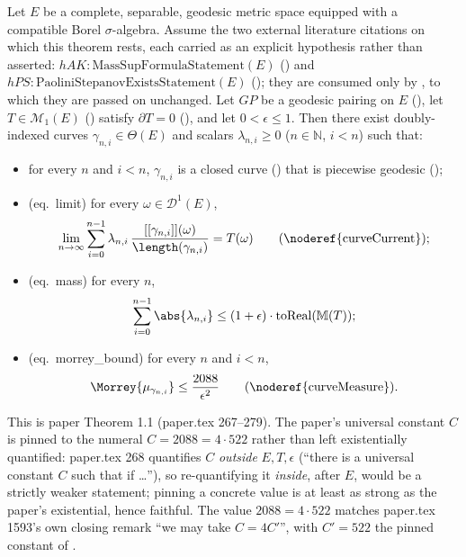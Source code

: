 \begin{theorem}\label{approximationMetric}
  Let $E$ be a complete, separable, geodesic metric space equipped with a compatible Borel
  $\sigma$-algebra. Assume the two external literature citations on which this theorem rests, each
  carried as an explicit hypothesis rather than asserted: $hAK \colon
  \mathrm{MassSupFormulaStatement}(E)$ () and $hPS \colon
  \mathrm{PaoliniStepanovExistsStatement}(E)$ (); they are consumed
  only by , to which they are passed on unchanged. Let $GP$ be a geodesic
  pairing on $E$ (), let
  $T \in \mathcal M_1(E)$ () satisfy $\partial T=0$
  (), and let $0<\epsilon\le1$. Then there exist doubly-indexed curves
  $\gamma_{n,i}\in\Theta(E)$ and scalars $\lambda_{n,i}\ge0$ ($n\in\mathbb N$, $i<n$) such that:
  \begin{itemize}
    \item[(a)] for every $n$ and $i<n$, $\gamma_{n,i}$ is a closed curve
      () that is piecewise geodesic ();
    \item[(b)] (eq.~limit) for every $\omega\in\mathcal D^1(E)$,
      \[
        \lim_{n\to\infty}\sum_{i=0}^{n-1}\lambda_{n,i}\,
          \frac{[[\gamma_{n,i}]](\omega)}{\length(\gamma_{n,i})}
        = T(\omega)
        \qquad\text{(\noderef{curveCurrent})}
        ;
      \]
    \item[(c)] (eq.~mass) for every $n$,
      \[
        \sum_{i=0}^{n-1}\abs{\lambda_{n,i}} \le (1+\epsilon)\cdot\mathrm{toReal}(\mathbb M(T))
        ;
      \]
    \item[(d)] (eq.~morrey\_bound) for every $n$ and $i<n$,
      \[
        \Morrey{\mu_{\gamma_{n,i}}} \le \frac{2088}{\epsilon^2}
        \qquad\text{(\noderef{curveMeasure})}
        .
      \]
  \end{itemize}

  This is paper Theorem 1.1 (paper.tex 267--279). The paper's universal constant $C$ is pinned to
  the numeral $C=2088=4\cdot522$ rather than left existentially quantified: paper.tex 268
  quantifies $C$ \emph{outside} $E,T,\epsilon$ (``there is a universal constant $C$ such that if
  \dots''), so re-quantifying it \emph{inside}, after $E$, would be a strictly weaker statement;
  pinning a concrete value is at least as strong as the paper's existential, hence faithful. The
  value $2088=4\cdot522$ matches paper.tex 1593's own closing remark ``we may take $C=4C'$'', with
  $C'=522$ the pinned constant of .


\end{theorem}
